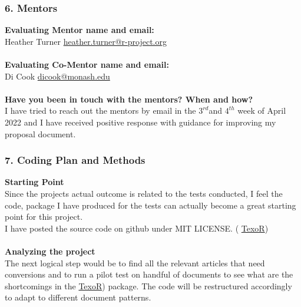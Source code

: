 \documentclass[12pt]{article}
\begin{document}
\subsubsection{6. Mentors}
{\large\bfseries Evaluating Mentor name and email:}\\ Heather Turner {\color{orange}\url{heather.turner@r-project.org}}\\
\\
{\large\bfseries Evaluating Co-Mentor name and email:}\\   Di Cook {\color{orange}\url{dicook@monash.edu}}\\
\\
{\large\bfseries Have you been in touch with the mentors? When and how?}\\
I have tried to reach out the mentors by email in the $3^{rd}$and $4^{th}$ week of April 2022 and I have received positive response with guidance for improving my proposal document.
\subsubsection{7. Coding Plan and Methods}
{\large\bfseries Starting Point}\\
 Since the projects actual outcome is related to the tests conducted, I feel the code, package I have produced for the tests can actually become a great starting point for this project.\\
 I have posted the source code on github under MIT LICENSE. ( \href{https://github.com/Abhi-1U/TexoR}{\color{orange}TexoR})\\
 \\
{\large\bfseries Analyzing the project}\\ 
 The next logical step would be to find all the relevant articles that need conversions and to run a pilot test on handful of documents to see what are the shortcomings in the \href{https://github.com/Abhi-1U/TexoR}{\color{orange}TexoR}) package. The code will be restructured accordingly to adapt to different document patterns.
 
\end{document}
